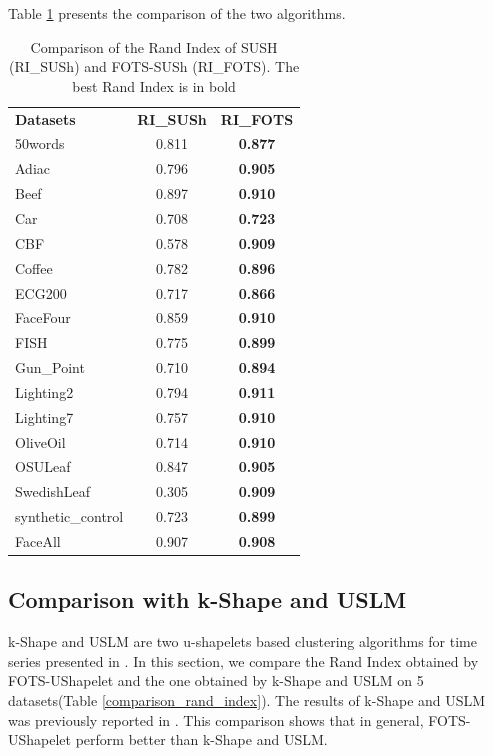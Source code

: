 Table \ref{ri} presents the comparison of the two algorithms.

\begin{table}[ht]
\centering
\begin{tabular}{lcc}
\textbf{Datasets}  & \textbf{RI\_SUSh} & \textbf{RI\_FOTS} \\
50words            & 0.811             & \textbf{0.877}    \\
Adiac              & 0.796             & \textbf{0.905}    \\
Beef               & 0.897             & \textbf{0.910}    \\
Car                & 0.708             & \textbf{0.723}    \\
CBF                & 0.578             & \textbf{0.909}    \\
Coffee             & 0.782             & \textbf{0.896}    \\
ECG200             & 0.717             & \textbf{0.866}    \\
FaceFour           & 0.859             & \textbf{0.910}    \\
FISH               & 0.775             & \textbf{0.899}    \\
Gun\_Point         & 0.710             & \textbf{0.894}    \\
Lighting2          & 0.794             & \textbf{0.911}    \\
Lighting7          & 0.757             & \textbf{0.910}    \\
OliveOil           & 0.714             & \textbf{0.910}    \\
OSULeaf            & 0.847             & \textbf{0.905}    \\
SwedishLeaf        & 0.305             & \textbf{0.909}    \\
synthetic\_control & 0.723             & \textbf{0.899}    \\
FaceAll            & 0.907             & \textbf{0.908}   
\end{tabular}
\caption{Comparison of the Rand Index of SUSH (RI\_SUSh) and FOTS-SUSh (RI\_FOTS). The best Rand Index is in bold}
\label{ri}
\end{table}

\subsection{Comparison with k-Shape and USLM}

k-Shape and USLM are two u-shapelets  based clustering algorithms for time series presented in \cite{zhang2016unsupervised}. In this section, we compare the Rand Index obtained by FOTS-UShapelet and the one obtained by k-Shape and USLM on 5 datasets(Table \ref{comparison_rand_index}). The results of k-Shape and USLM was previously reported in \cite{zhang2016unsupervised}. This comparison shows that in general, FOTS-UShapelet perform better than k-Shape and USLM.

